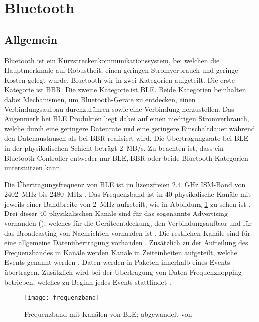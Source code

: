 \section{Bluetooth}

\subsection{Allgemein}

Bluetooth ist ein Kurzstreckenkommunikationssystem, bei welchen die Hauptmerkmale auf Robustheit, einen geringen Stromverbrauch und geringe Kosten gelegt wurde. Bluetooth wir in zwei Kategorien aufgeteilt. Die erste Kategorie ist \ac{BBR}. Die zweite Kategorie ist \ac{BLE}. Beide Kategorien beinhalten dabei Mechanismen, um Bluetooth-Geräte zu entdecken, einen Verbindungsaufbau durchzuführen sowie eine Verbindung herzustellen. Das Augenmerk bei \ac{BLE} Produkten liegt dabei auf einen niedrigen Stromverbrauch, welche durch eine geringere Datenrate und eine geringere Einschaltdauer während den Datenaustausch als bei \ac{BBR} realisiert wird. Die Übertragungsrate bei \ac{BLE} in der physikalischen Schicht beträgt 2~MB/s. Zu beachten ist, dass ein Bluetooth-Controller entweder nur \ac{BLE}, \ac{BBR} oder beide Bluetooth-Kategorien unterstützen kann. \cite[S.~187]{bluetoothCore}

Die Übertragungsfrequenz von \ac{BLE} ist im lizenzfreien 2.4~GHz \acf{ISM}-Band von 2402~MHz bis 2480~MHz \cites[S.~4]{siliconBLE}[S.~190]{bluetoothCore}. Das Frequenzband ist in 40 physikalische Kanäle mit jeweils einer Bandbreite von 2~MHz aufgeteilt, wie in Abbildung \ref{fig:frequenzbandBLE} zu sehen ist \cite[S.~190]{bluetoothCore}. Drei dieser 40 physikalischen Kanäle sind für das sogenannte Advertising vorhanden ()\cite[S.~190]{bluetoothCore}, welches für die Geräteentdeckung, den Verbindungsaufbau und für das Broadcasting von Nachrichten vorhanden ist \cite[S.~4]{siliconBLE}. Die restlichen Kanäle sind für eine allgemeine Datenübertragung vorhanden \cite[S.~190]{bluetoothCore}. Zusätzlich zu der Aufteilung des Frequenzbandes in Kanäle werden Kanäle in Zeiteinheiten aufgeteilt, welche Events genannt werden \cite[S.~190]{bluetoothCore}. Daten werden in Paketen innerhalb eines Events übertragen. Zusätzlich wird bei der Übertragung von Daten Frequenzhopping betrieben, welches zu Beginn jedes Events stattfindet \cite[S.~190f.]{bluetoothCore}. 

\begin{figure}[h]
\centering
\texttt{[image: frequenzband]}
\caption{Frequenzband mit Kanälen von \ac{BLE}; abgewandelt von \cite[S.~4]{siliconBLE}}
\label{fig:frequenzbandBLE}
\end{figure}

